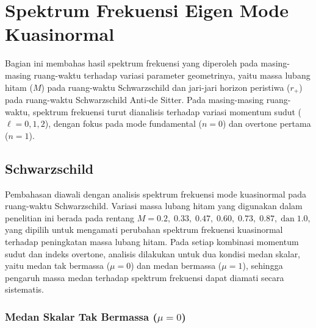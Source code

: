 \section{Spektrum Frekuensi Eigen Mode Kuasinormal}
\label{sec:spektrum}

\noindent Bagian ini membahas hasil spektrum frekuensi yang diperoleh pada masing-masing ruang-waktu terhadap variasi parameter geometrinya, yaitu massa lubang hitam ($M$) pada ruang-waktu Schwarzschild dan jari-jari horizon peristiwa ($r_+$) pada ruang-waktu Schwarzschild Anti-de Sitter. Pada masing-masing ruang-waktu, spektrum frekuensi turut dianalisis terhadap variasi momentum sudut ($\ell = 0, 1, 2$), dengan fokus pada mode fundamental ($n=0$) dan overtone pertama ($n=1$).

\subsection{Schwarzschild}
\label{subsec:frek-sch}

Pembahasan diawali dengan analisis spektrum frekuensi mode kuasinormal pada ruang-waktu Schwarzschild. Variasi massa lubang hitam yang digunakan dalam penelitian ini berada pada rentang $M = 0.2,\;0.33,\;0.47,\;0.60,\;0.73,\;0.87,\;\text{dan}\;1.0$, yang dipilih untuk mengamati perubahan spektrum frekuensi kuasinormal terhadap peningkatan massa lubang hitam. Pada setiap kombinasi momentum sudut dan indeks overtone, analisis dilakukan untuk dua kondisi medan skalar, yaitu medan tak bermassa ($\mu=0$) dan medan bermassa ($\mu=1$), sehingga pengaruh massa medan terhadap spektrum frekuensi dapat diamati secara sistematis.

\subsubsection*{Medan Skalar Tak Bermassa ($\mu=0$)}

